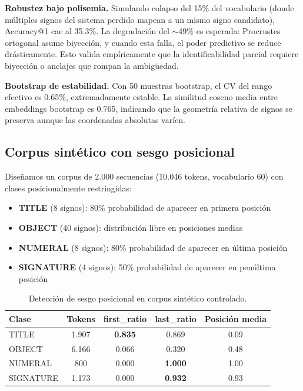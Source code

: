 \documentclass[11pt,a4paper]{article}
\newcommand{\1}{\mathbf{1}}
\numberwithin{equation}{section}
\begin{document}
\textbf{Robustez bajo polisemia.} Simulando colapso del 15\% del vocabulario (donde múltiples signos del sistema perdido mapean a un mismo signo candidato), Accuracy@1 cae al 35.3\%. La degradación del $\sim$49\% es esperada: Procrustes ortogonal asume biyección, y cuando esta falla, el poder predictivo se reduce drásticamente. Esto valida empíricamente que la identificabilidad parcial requiere biyección o anclajes que rompan la ambigüedad.

\textbf{Bootstrap de estabilidad.} Con 50 muestras bootstrap, el CV del rango efectivo es 0.65\%, extremadamente estable. La similitud coseno media entre embeddings bootstrap es 0.765, indicando que la geometría relativa de signos se preserva aunque las coordenadas absolutas varíen.

\subsection{Corpus sintético con sesgo posicional}

Diseñamos un corpus de 2.000 secuencias (10.046 tokens, vocabulario 60) con clases posicionalmente restringidas:
\begin{itemize}
    \item \textbf{TITLE} (8 signos): 80\% probabilidad de aparecer en primera posición
    \item \textbf{OBJECT} (40 signos): distribución libre en posiciones medias
    \item \textbf{NUMERAL} (8 signos): 80\% probabilidad de aparecer en última posición
    \item \textbf{SIGNATURE} (4 signos): 50\% probabilidad de aparecer en penúltima posición
\end{itemize}

\begin{table}[h]
\centering
\caption{Detección de sesgo posicional en corpus sintético controlado.}
\label{tab:positional_synthetic}
\begin{tabular}{lcccc}
\toprule
Clase & Tokens & first\_ratio & last\_ratio & Posición media \\
\midrule
TITLE & 1.907 & \textbf{0.835} & 0.869 & 0.09 \\
OBJECT & 6.166 & 0.066 & 0.320 & 0.48 \\
NUMERAL & 800 & 0.000 & \textbf{1.000} & 1.00 \\
SIGNATURE & 1.173 & 0.000 & \textbf{0.932} & 0.93 \\
\bottomrule
\end{tabular}
\end{table}
\end{document}
